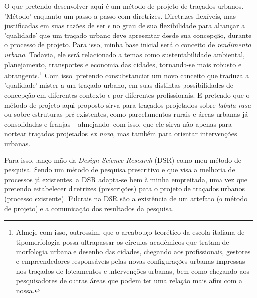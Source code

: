 \documentclass[]{report}
\begin{document}
    O que pretendo desenvolver aqui é um método de projeto de traçados urbanos. 'Método' enquanto um passo-a-passo com diretrizes. Diretrizes flexíveis, mas justificadas em suas razões de ser e no grau de sua flexibilidade para alcançar a 'qualidade' que um traçado urbano deve apresentar desde sua concepção, durante o processo de projeto. Para isso, minha base inicial será o conceito de \textit{rendimento urbano}. Todavia, ele será relacionado a temas como sustentabilidade ambiental, planejamento, transportes e economia das cidades, tornando-se mais robusto e abrangente.\footnote[1]{Almejo com isso, outrossim, que o arcabouço teorético da escola italiana de tipomorfologia possa ultrapassar os círculos acadêmicos que tratam de morfologia urbana e desenho das cidades, chegando aos profissionais, gestores e empreendedores responsáveis pelas novas configurações urbanas impressas nos traçados de loteamentos e intervenções urbanas, bem como chegando aos pesquisadores de outras áreas que podem ter uma relação mais afim com a nossa.} Com isso, pretendo consubstanciar um novo conceito que traduza a 'qualidade' mister a um traçado urbano, em suas distintas possibilidades de concepção em diferentes contexto e por diferentes profissionais. E pretendo que o método de projeto aqui proposto sirva para traçados projetados sobre \textit{tabula rasa} ou sobre estruturas pré-existentes, como parcelamentos rurais e áreas urbanas já consolidadas e franjas – almejando, com isso, que ele sirva não apenas para nortear traçados projetados \textit{ex novo}, mas também para orientar intervenções urbanas. 

    Para isso, lanço mão da \textit{Design Science Research} (DSR) como meu método de pesquisa. Sendo um método de pesquisa prescritivo e que visa a melhoria de processos já existentes, a DSR adapta-se bem à minha empreitada, uma vez que pretendo estabelecer diretrizes (prescrições) para o projeto de traçados urbanos (processo existente). Fulcrais na DSR são a existência de um artefato (o método de projeto) e a comunicação dos resultados da pesquisa.




    
    
\end{document}
